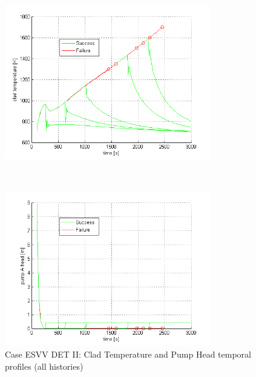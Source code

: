 \begin{figure}
 \begin{minipage}[b]{8.5cm}
  \centering
   \includegraphics[width=9cm]{figures/DETvarClad.png}
 \end{minipage}
 \ \hspace{2mm} \hspace{3mm} \
 \begin{minipage}[b]{8.5cm}
  \centering
   \includegraphics[width=9cm]{figures/DETvarHead.png}
 \end{minipage}
\caption{Case ESVV DET II: Clad Temperature and Pump Head temporal profiles (all histories)}
\label{fig:ESVVall}
\end{figure}

